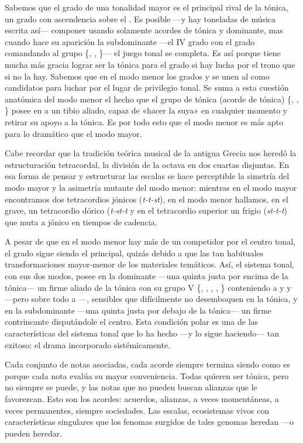 \documentclass[a4paper,10pt]{article}
\begin{document}
\begin{multicols}{2}
Sabemos que el  grado de una tonalidad mayor es el principal rival de la tónica, un grado con ascendencia sobre el . Es posible ---y hay toneladas de música escrita así--- componer usando solamente acordes de tónica y dominante, mas cuando hace su aparición la subdominante ---el IV grado con el  grado comandando al grupo \{, , \}--- el juego tonal se completa. Es así porque tiene mucha más gracia lograr ser la tónica para el  grado si hay lucha por el trono que si no la hay. Sabemos que en el modo menor los grados  y  se unen al  como candidatos para luchar por el lugar de privilegio tonal. Se suma a esta cuestión anatómica del modo menor el hecho que el grupo de tónica (acorde de tónica) \{, , \} posee en  a un tibio aliado, capaz de «hacer la suya» en cualquier momento y retirar su apoyo a la tónica. Es por todo esto que el modo menor es más apto para lo dramático que el modo mayor.

Cabe recordar que la tradición teórica musical de la antigua Grecia nos heredó la estructuración tetracordal, la división de la octava en dos cuartas disjuntas. En esa forma de pensar y estructurar las escalas se hace perceptible la simetría del modo mayor y la asimetría mutante del modo menor: mientras en el modo mayor encontramos dos tetracordios jónicos (\emph{t-t-st}), en el modo menor hallamos, en el grave, un tetracordio dórico (\emph{t-st-t} y en el tetracordio superior un frigio (\emph{st-t-t}) que muta a jónico en tiempos de cadencia.

A pesar de que en el modo menor hay más de un competidor por el centro tonal, el  grado sigue siendo el principal, quizás debido a que las tan habituales transformaciones mayor-menor de los materiales temáticos. Así, el sistema tonal, con sus dos modos, posee en la dominante ---una quinta justa por encima de la tónica--- un firme aliado de la tónica con su grupo V \{, , , , \} conteniendo a  y  y  ---pero sobre todo a ---, sensibles que difícilmente no desemboquen en la tónica, y en la subdominante ---una quinta justa por debajo de la tónica--- un firme contrincante disputándole el centro. Esta condición polar es una de las características del sistema tonal que lo ha hecho ---y lo sigue haciendo--- tan exitoso: el drama incorporado sistémicamente.

Cada conjunto de notas asociadas, cada acorde siempre termina siendo como es porque cada nota evalúa su mayor conveniencia. Todas quieren ser tónica, pero no siempre se puede, y las notas que no pueden buscan alianzas que le favorezcan. Esto son los acordes: acuerdos, alianzas, a veces momentáneas, a veces permanentes, siempre sociedades. Las escalas, ecosistemas vivos con características singulares que los fenomas surgidos de tales genomas heredan ---o pueden heredar.


\end{multicols}
\end{document}
